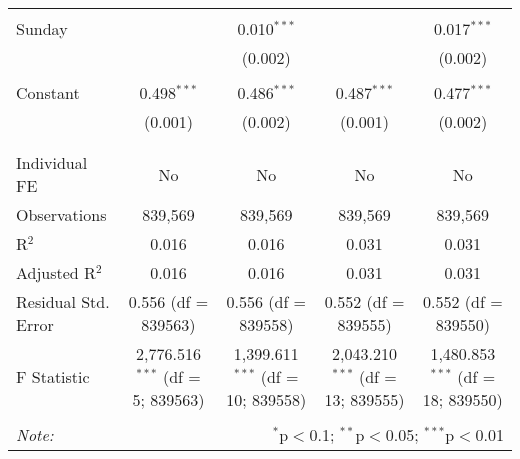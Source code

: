 \documentclass[
]{article}
\begin{document}
\begin{table}[!htbp]
{\begin{tabular}{@{\extracolsep{5pt}}lcccc}
  & & & & \\ 
 Sunday &  & 0.010$^{***}$ &  & 0.017$^{***}$ \\ 
  &  & (0.002) &  & (0.002) \\ 
  & & & & \\ 
 Constant & 0.498$^{***}$ & 0.486$^{***}$ & 0.487$^{***}$ & 0.477$^{***}$ \\ 
  & (0.001) & (0.002) & (0.001) & (0.002) \\ 
  & & & & \\ 
\hline \\[-1.8ex] 
Individual FE & No & No & No & No \\ 
Observations & 839,569 & 839,569 & 839,569 & 839,569 \\ 
R$^{2}$ & 0.016 & 0.016 & 0.031 & 0.031 \\ 
Adjusted R$^{2}$ & 0.016 & 0.016 & 0.031 & 0.031 \\ 
Residual Std. Error & 0.556 (df = 839563) & 0.556 (df = 839558) & 0.552 (df = 839555) & 0.552 (df = 839550) \\ 
F Statistic & 2,776.516$^{***}$ (df = 5; 839563) & 1,399.611$^{***}$ (df = 10; 839558) & 2,043.210$^{***}$ (df = 13; 839555) & 1,480.853$^{***}$ (df = 18; 839550) \\ 
\hline 
\hline \\[-1.8ex] 
\textit{Note:}  & \multicolumn{4}{r}{$^{*}$p$<$0.1; $^{**}$p$<$0.05; $^{***}$p$<$0.01} \\ 
\end{tabular}
} 
\end{table} 
\newpage
\end{document}
